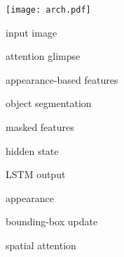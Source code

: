
\vspace{.5\baselineskip}

\begin{minipage}[c]{0.475\textwidth}
    \centering
    \begin{minipage}[c]{\textwidth}
    \texttt{[image: arch.pdf]}
    \end{minipage}
    \vspace{-1\baselineskip}
    
    \begin{minipage}[c]{0.5\textwidth}
        \begin{description}[labelsep=1em, leftmargin=!,labelwidth=\widthof{\bfseries $\bmapt$}]
            \item[$\bxt$] input image
            \item[$\bgt$] attention glimpse
            \item[$\bmapt$] appearance-based features
            \item[$\bst$] object segmentation
            \item[$\bvt$] masked features
        \end{description}
    \end{minipage}\hfill
    \begin{minipage}[c]{0.5\textwidth}
       \begin{description}[labelsep=1em, leftmargin=!,labelwidth=\widthof{\bfseries $\Delta \widehat{\bb}_t$}]
            \item[$\B{h}_t$] hidden state
            \item[$\bot$] LSTM output
            \item[$\bapp_{t+1}$] appearance
            \item[$\Delta \widehat{\bb}_t$] bounding-box update
            \item[$\ba_{t+1}$] spatial attention
        \end{description}
    \end{minipage}
\end{minipage}

